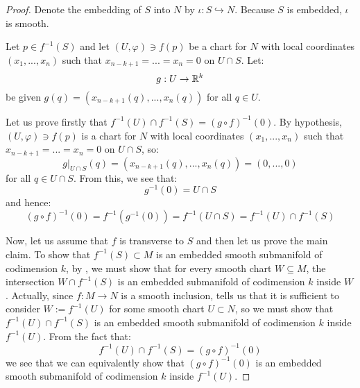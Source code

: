             \begin{proof}
                Denote the embedding of $S$ into $N$ by $\iota: S \hookrightarrow N$. Because $S$ is embedded, $\iota$ is smooth.
            
                Let $p \in f^{-1}(S)$ and let $(U, \varphi) \ni f(p)$ be a chart for $N$ with local coordinates $(x_1, ..., x_n)$ such that $x_{n - k + 1} = ... = x_n = 0$ on $U \cap S$. Let:
                    $$g: U \to \mathbb{R}^k$$
                be given $g(q) = (x_{n - k + 1}(q), ..., x_n(q))$ for all $q \in U$.

                Let us prove firstly that $f^{-1}(U) \cap f^{-1}(S) = (g \circ f)^{-1}(0)$. By hypothesis, $(U, \varphi) \ni f(p)$ is a chart for $N$ with local coordinates $(x_1, ..., x_n)$ such that $x_{n - k + 1} = ... = x_n = 0$ on $U \cap S$, so:
                    $$g|_{U \cap S}(q) = (x_{n - k + 1}(q), ..., x_n(q)) = (0, ..., 0)$$
                for all $q \in U \cap S$. From this, we see that:
                    $$g^{-1}(0) = U \cap S$$
                and hence:
                    $$(g \circ f)^{-1}(0) = f^{-1}( g^{-1}(0) ) = f^{-1}(U \cap S) = f^{-1}(U) \cap f^{-1}(S)$$

                Now, let us assume that $f$ is transverse to $S$ and then let us prove the main claim. To show that $f^{-1}(S) \subset M$ is an embedded smooth submanifold of codimension $k$, by \cite[Proposition 5.2]{lee_smooth_manifolds}, we must show that for every smooth chart $W \subseteq M$, the intersection $W \cap f^{-1}(S)$ is an embedded submanifold of codimension $k$ inside $W$. Actually, since $f: M \to N$ is a smooth inclusion, \cite[Theorem 4.25]{lee_smooth_manifolds} tells us that it is sufficient to consider $W := f^{-1}(U)$ for some smooth chart $U \subset N$, so we must show that $f^{-1}(U) \cap f^{-1}(S)$ is an embedded smooth submanifold of codimension $k$ inside $f^{-1}(U)$. From the fact that:
                    $$f^{-1}(U) \cap f^{-1}(S) = (g \circ f)^{-1}(0)$$
                we see that we can equivalently show that $(g \circ f)^{-1}(0)$ is an embedded smooth submanifold of codimension $k$ inside $f^{-1}(U)$.


\end{proof}
